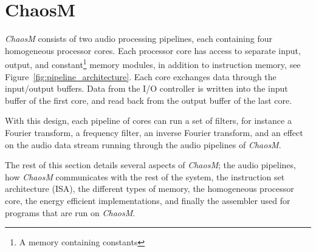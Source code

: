 
\FloatBarrier
\section{ChaosM}\label{chapter:fpga}

\textit{ChaosM} consists of two audio processing pipelines, each containing four
homogeneous processor cores. Each processor core has access to separate input, output, and constant\footnote{A memory containing constants} memory modules, in addition to instruction memory, see Figure~\ref{fig:pipeline_architecture}. Each core exchanges data
through the input/output buffers. Data from the I/O controller is written into
the input buffer of the first core, and read back from the output buffer of the
last core.

With this design, each pipeline of cores can run a set of filters, for instance
a Fourier transform, a frequency filter, an inverse Fourier transform, and an
effect on the audio data stream running through the audio pipelines of
\textit{ChaosM}.

The rest of this section details several aspects of \textit{ChaosM}; the audio
pipelines, how \textit{ChaosM} communicates with the rest of the system, the
instruction set architecture (ISA), the different types of memory, the homogeneous
processor core, the energy efficient implementations, and finally the assembler
used for programs that are run on \textit{ChaosM}.









